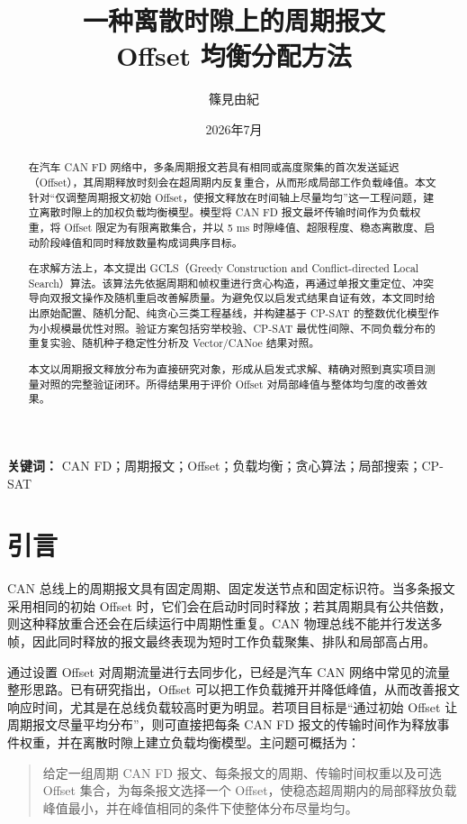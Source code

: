 \documentclass[UTF8,12pt,a4paper]{ctexart}
\title{\bfseries 一种离散时隙上的周期报文\\Offset 均衡分配方法}
\author{篠見由紀}
\date{2026年7月}
\begin{document}
\maketitle

\begin{abstract}
在汽车 CAN FD 网络中，多条周期报文若具有相同或高度聚集的首次发送延迟（Offset），其周期释放时刻会在超周期内反复重合，从而形成局部工作负载峰值。本文针对“仅调整周期报文初始 Offset，使报文释放在时间轴上尽量均匀”这一工程问题，建立离散时隙上的加权负载均衡模型。模型将 CAN FD 报文最坏传输时间作为负载权重，将 Offset 限定为有限离散集合，并以 5 ms 时隙峰值、超限程度、稳态离散度、启动阶段峰值和同时释放数量构成词典序目标。

在求解方法上，本文提出 GCLS（Greedy Construction and Conflict-directed Local Search）算法。该算法先依据周期和帧权重进行贪心构造，再通过单报文重定位、冲突导向双报文操作及随机重启改善解质量。为避免仅以启发式结果自证有效，本文同时给出原始配置、随机分配、纯贪心三类工程基线，并构建基于 CP-SAT 的整数优化模型作为小规模最优性对照。验证方案包括穷举校验、CP-SAT 最优性间隙、不同负载分布的重复实验、随机种子稳定性分析及 Vector/CANoe 结果对照。

本文以周期报文释放分布为直接研究对象，形成从启发式求解、精确对照到真实项目测量对照的完整验证闭环。所得结果用于评价 Offset 对局部峰值与整体均匀度的改善效果。
\end{abstract}

\noindent\textbf{关键词：} CAN FD；周期报文；Offset；负载均衡；贪心算法；局部搜索；CP-SAT

\tableofcontents
\newpage

\section{引言}

CAN 总线上的周期报文具有固定周期、固定发送节点和固定标识符。当多条报文采用相同的初始 Offset 时，它们会在启动时同时释放；若其周期具有公共倍数，则这种释放重合还会在后续运行中周期性重复。CAN 物理总线不能并行发送多帧，因此同时释放的报文最终表现为短时工作负载聚集、排队和局部高占用。

通过设置 Offset 对周期流量进行去同步化，已经是汽车 CAN 网络中常见的流量整形思路。已有研究指出，Offset 可以把工作负载摊开并降低峰值，从而改善报文响应时间，尤其是在总线负载较高时更为明显\cite{yomsi2012,grenier2008}。若项目目标是“通过初始 Offset 让周期报文尽量平均分布”，则可直接把每条 CAN FD 报文的传输时间作为释放事件权重，并在离散时隙上建立负载均衡模型。主问题可概括为：

\begin{quote}
给定一组周期 CAN FD 报文、每条报文的周期、传输时间权重以及可选 Offset 集合，为每条报文选择一个 Offset，使稳态超周期内的局部释放负载峰值最小，并在峰值相同的条件下使整体分布尽量均匀。
\end{quote}
\end{document}
